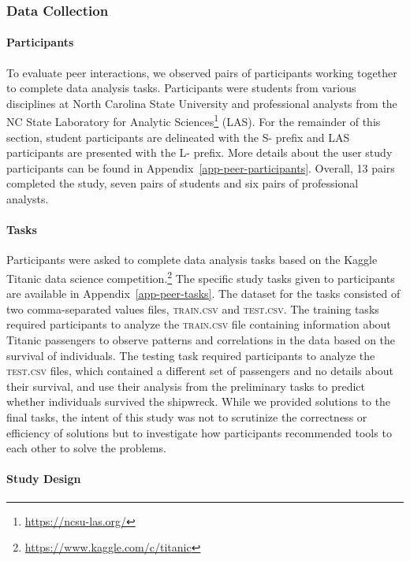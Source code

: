 \subsubsection{Data Collection}

\paragraph*{Participants}

To evaluate peer interactions, we observed pairs of participants working together to complete data analysis tasks. Participants were students from various disciplines at North Carolina State University and professional analysts from the NC State Laboratory for Analytic Sciences\footnote{\url{https://ncsu-las.org/}} (LAS). For the remainder of this section, student participants are delineated with the S- prefix and LAS participants are presented with the L- prefix. More details about the user study participants can be found in Appendix~\ref{app-peer-participants}. Overall, 13 pairs completed the study, seven pairs of students and six pairs of professional analysts.

\paragraph*{Tasks}

Participants were asked to complete data analysis tasks based on the Kaggle Titanic data science competition.\footnote{\url{https://www.kaggle.com/c/titanic}} The specific study tasks given to participants are available in Appendix~\ref{app-peer-tasks}. The dataset for the tasks consisted of two comma-separated values files, \textsc{train.csv} and \textsc{test.csv}. The training tasks required participants to analyze the \textsc{train.csv} file containing information about Titanic passengers to observe patterns and correlations in the data based on the survival of individuals. The testing task required participants to analyze the \textsc{test.csv} files, which contained a different set of passengers and no details about their survival, and use their analysis from the preliminary tasks to predict whether individuals survived the shipwreck. While we provided solutions to the final tasks, the intent of this study was not to scrutinize the correctness or efficiency of solutions but to investigate how participants recommended tools to each other to solve the problems. 

\paragraph*{Study Design}

